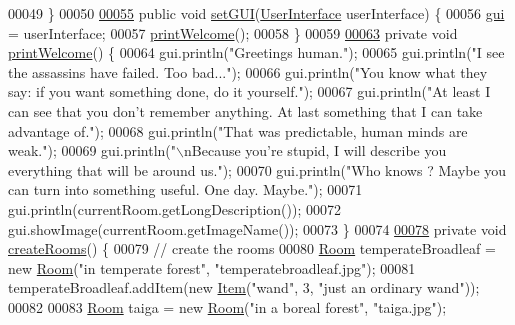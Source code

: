 \begin{DoxyCode}
00049     \}
00050 
\hypertarget{GameEngine_8java_source_l00055}{}\hyperlink{classGameEngine_aec901a5b590b3cd204f196165da5dfb6}{00055}     \textcolor{keyword}{public} \textcolor{keywordtype}{void} \hyperlink{classGameEngine_aec901a5b590b3cd204f196165da5dfb6}{setGUI}(\hyperlink{classUserInterface}{UserInterface} userInterface) \{
00056         \hyperlink{classGameEngine_a2a7d0bb6183b3f3ef3ee2008926374a0}{gui} = userInterface;
00057         \hyperlink{classGameEngine_a9a2f3cb921bb19399e357bf14d26425b}{printWelcome}();
00058     \}
00059 
\hypertarget{GameEngine_8java_source_l00063}{}\hyperlink{classGameEngine_a9a2f3cb921bb19399e357bf14d26425b}{00063}     \textcolor{keyword}{private} \textcolor{keywordtype}{void} \hyperlink{classGameEngine_a9a2f3cb921bb19399e357bf14d26425b}{printWelcome}() \{
00064         gui.println(\textcolor{stringliteral}{"Greetings human."});
00065         gui.println(\textcolor{stringliteral}{"I see the assassins have failed. Too bad..."});
00066         gui.println(\textcolor{stringliteral}{"You know what they say: if you want something done, do it yourself."});
00067         gui.println(\textcolor{stringliteral}{"At least I can see that you don't remember anything. At last something that I can take
       advantage of."});
00068         gui.println(\textcolor{stringliteral}{"That was predictable, human minds are weak."});
00069         gui.println(\textcolor{stringliteral}{"\(\backslash\)nBecause you're stupid, I will describe you everything that will be around us."});
00070         gui.println(\textcolor{stringliteral}{"Who knows ? Maybe you can turn into something useful. One day. Maybe."});
00071         gui.println(currentRoom.getLongDescription());
00072         gui.showImage(currentRoom.getImageName());
00073     \}
00074 
\hypertarget{GameEngine_8java_source_l00078}{}\hyperlink{classGameEngine_ac32e0d61566d0cca0a1683b5fcf37a00}{00078}     \textcolor{keyword}{private} \textcolor{keywordtype}{void} \hyperlink{classGameEngine_ac32e0d61566d0cca0a1683b5fcf37a00}{createRooms}() \{
00079         \textcolor{comment}{// create the rooms}
00080         \hyperlink{classRoom}{Room} temperateBroadleaf = \textcolor{keyword}{new} \hyperlink{classRoom}{Room}(\textcolor{stringliteral}{"in temperate forest"}, \textcolor{stringliteral}{"temperatebroadleaf.jpg"});
00081         temperateBroadleaf.addItem(\textcolor{keyword}{new} \hyperlink{classItem}{Item}(\textcolor{stringliteral}{"wand"}, 3, \textcolor{stringliteral}{"just an ordinary wand"}));
00082 
00083         \hyperlink{classRoom}{Room} taiga = \textcolor{keyword}{new} \hyperlink{classRoom}{Room}(\textcolor{stringliteral}{"in a boreal forest"}, \textcolor{stringliteral}{"taiga.jpg"});

\end{DoxyCode}
